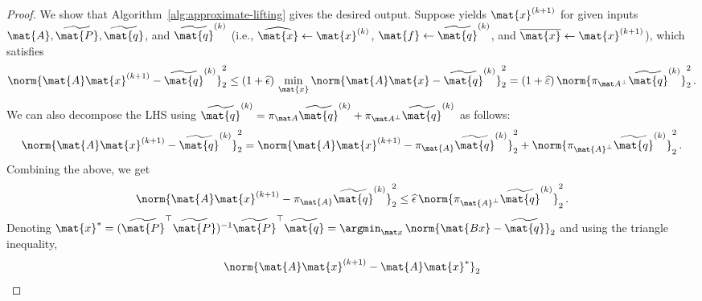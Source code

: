 \begin{proof}


We show that Algorithm~\ref{alg:approximate-lifting} gives the desired output.
Suppose \ApproximateSolve yields $\mat{x}^{(k+1)}$ for given inputs $\mat{A},\widetilde{\mat{P}},\widetilde{\mat{q}}$, and $\widetilde{\mat{q}}^{(k)}$ (i.e., $\widehat{\mat{x}} \gets \mat{x}^{(k)}$, $\mat{f}\gets \widetilde{\mat{q}}^{(k)}$, and $\overline{\mat{x}} \gets \mat{x}^{(k+1)}$), which satisfies
\[
    \norm{\mat{A}\mat{x}^{(k+1)}-\widetilde{\mat{q}}^{(k)}}_2^2\leq (1+\widehat{\epsilon})\,\min_{\mat{x}} \norm{\mat{A}\mat{x}-\widetilde{\mat{q}}^{(k)}}_2^2
    = (1+\widehat{\varepsilon})\,\norm{\pi_{\mat A ^\perp}\widetilde{\mat{q}}^{(k)}}_2^2\,.
\]
We can also decompose the LHS using $\widetilde{\mat{q}}^{(k)} = \pi_{\mat A} \widetilde{\mat{q}}^{(k)} + \pi_{\mat A ^\perp} \widetilde{\mat{q}}^{(k)}$ as follows:
\[
    \norm{\mat{A}\mat{x}^{(k+1)}-\widetilde{\mat{q}}^{(k)}}_2^2
    = 
    \norm{\mat{A}\mat{x}^{(k+1)} - \pi_{\mat{A}}\widetilde{\mat{q}}^{(k)}}_2^2 + \norm{\pi_{\mat{A}^{\perp}} \widetilde{\mat{q}}^{(k)}}_2^2\,.
\]
Combining the above, we get
\[
    \norm{\mat{A}\mat{x}^{(k+1)} - \pi_{\mat{A}}\widetilde{\mat{q}}^{(k)}}_2^2
    \leq
    \widehat{\epsilon}\, \norm{\pi_{\mat{A}^{\perp}}\widetilde{\mat{q}}^{(k)}}_2^2\,.
\]
Denoting $\mat{x}^* = (\widetilde{\mat{P}}^\top \widetilde{\mat{P}})^{-1} \widetilde{\mat{P}}^\top \widetilde{\mat{q}} = \argmin_{\mat x}\,\norm{\mat{Bx}-\widetilde{\mat{q}}}_2$ and using the triangle inequality,
\begin{align}
\nonumber
    \norm{\mat{A}\mat{x}^{(k+1)} - \mat{A}\mat{x}^*}_2

\end{align}
\end{proof}
